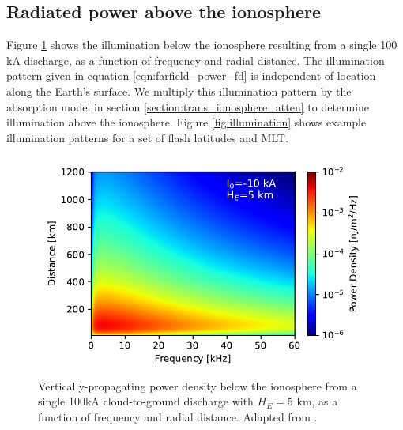 \subsection{Radiated power above the ionosphere}
Figure \ref{fig:illumination_radial} shows the illumination below the ionosphere resulting from a single 100 kA discharge, as a function of frequency and radial distance. The illumination pattern given in equation \eqref{eqn:farfield_power_fd} is independent of location along the Earth's surface. We multiply this illumination pattern by the absorption model in section \ref{section:trans_ionosphere_atten} to determine illumination above the ionosphere. Figure \ref{fig:illumination} shows example illumination patterns for a set of flash latitudes and MLT.

\begin{figure}[h!]
\begin{center}
\includegraphics{figures/power_scaling_below_ionosphere.pdf}
\caption[Illumination pattern below the ionosphere]{Vertically-propagating power density below the ionosphere from a single 100kA cloud-to-ground discharge with $H_E= $5 km, as a function of frequency and radial distance. Adapted from \cite{Marshall2011}.}
\label{fig:illumination_radial}
\end{center}
\end{figure}
